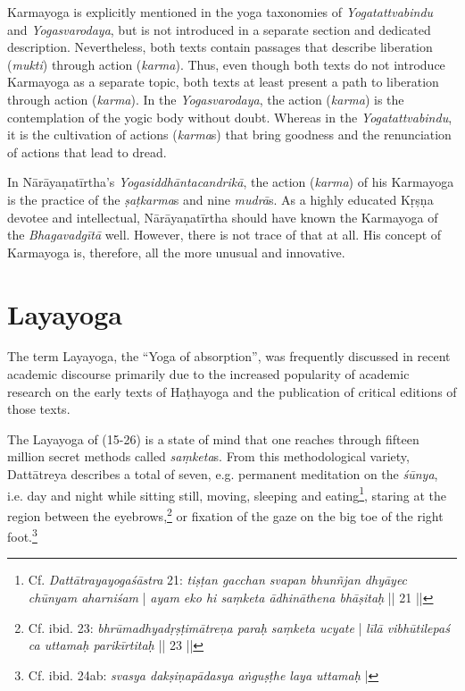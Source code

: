 Karmayoga is explicitly mentioned in the yoga taxonomies of \textit{Yogatattvabindu} and \textit{Yogasvarodaya}, but is not introduced in a separate section and dedicated description. Nevertheless, both texts contain passages that describe liberation (\textit{mukti}) through action (\textit{karma}). Thus, even though both texts do not introduce Karmayoga as a separate topic, both texts at least present a path to liberation through action (\textit{karma}). In the \textit{Yogasvarodaya}, the action (\textit{karma}) is the contemplation of the yogic body without doubt. Whereas in the \textit{Yogatattvabindu}, it is the cultivation of actions (\textit{karma}s) that bring goodness and the renunciation of actions that lead to dread. 

In Nārāyaṇatīrtha's \emph{Yogasiddhāntacandrikā}, the action (\textit{karma}) of his Karmayoga is the practice of the \textit{ṣaṭkarma}s and nine \textit{mudrā}s. As a highly educated Kṛṣṇa devotee and intellectual, Nārāyaṇatīrtha should have known the Karmayoga of the \emph{Bhagavadgītā} well. However, there is not trace of that at all. His concept of Karmayoga is, therefore, all the more unusual and innovative.   

\section{Layayoga}
\label{layayogaintro}

The term Layayoga, the ``Yoga of absorption'', was frequently discussed in recent academic discourse primarily due to the increased popularity of academic research on the early texts of Haṭhayoga and the publication of critical editions of those texts. 

The Layayoga of  (15-26) is a state of mind that one reaches through fifteen million secret methods called \textit{saṃketa}s. From this methodological variety, Dattātreya describes a total of seven, e.g. permanent meditation on the \textit{śūnya}, i.e. day and night while sitting still, moving, sleeping and eating\footnote{Cf. \emph{Dattātrayayogaśāstra} 21: \textit{tiṣṭan gacchan svapan bhunñjan dhyāyec chūnyam aharniśam} | \textit{ayam eko hi saṃketa ādhināthena bhāṣitaḥ} || 21 ||}, staring at the region between the eyebrows,\footnote{Cf. ibid. 23: \textit{bhrūmadhyadṛṣṭimātreṇa paraḥ saṃketa ucyate} | \textit{līlā vibhūtilepaś ca uttamaḥ parikīrtitaḥ} || 23 ||} or fixation of the gaze on the big toe of the right foot.\footnote{Cf. ibid. 24ab: \textit{svasya dakṣiṇapādasya aṅguṣṭhe laya uttamaḥ} |}

